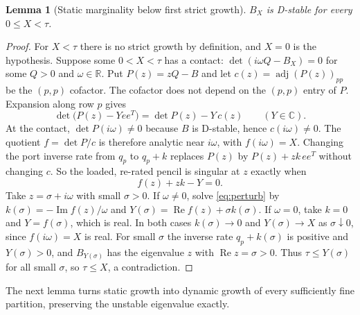 \documentclass[11pt,a4paper]{article}
\theoremstyle{plain}
\newtheorem{lemma}[theorem]{Lemma}
\theoremstyle{definition}
\theoremstyle{remark}
\newcommand{\R}{\mathbb{R}}
\newcommand{\C}{\mathbb{C}}
\newcommand{\Real}{\operatorname{Re}}
\newcommand{\Imag}{\operatorname{Im}}
\newcommand{\adj}{\operatorname{adj}}
\begin{document}
\begin{lemma}[Static marginality below first strict growth]\label{lem:marginal}
$B_X$ is D-stable for every $0\le X<\tau$.
\end{lemma}
\begin{proof}
For $X<\tau$ there is no strict growth by definition, and $X=0$ is the
hypothesis. Suppose some $0<X<\tau$ has a contact: $\det(i\omega Q-B_X)=0$ for
some $Q>0$ and $\omega\in\R$. Put $P(z)=zQ-B$ and let
$c(z)=\adj(P(z))_{pp}$ be the $(p,p)$ cofactor. The cofactor does not depend on
the $(p,p)$ entry of $P$. Expansion along row $p$ gives
\[
 \det\bigl(P(z)-Yee^{T}\bigr)=\det P(z)-Y\,c(z)\qquad(Y\in\C).
\]
At the contact, $\det P(i\omega)\ne0$ because $B$ is D-stable, hence
$c(i\omega)\ne0$. The quotient $f=\det P/c$ is therefore analytic near
$i\omega$, with $f(i\omega)=X$. Changing the port inverse rate from $q_p$ to
$q_p+k$ replaces $P(z)$ by $P(z)+zk\,ee^{T}$ without changing $c$. So the
loaded, re-rated pencil is singular at $z$ exactly when
\begin{equation}\label{eq:perturb}
 f(z)+zk-Y=0 .
\end{equation}
Take $z=\sigma+i\omega$ with small $\sigma>0$. If $\omega\ne0$, solve
\eqref{eq:perturb} by $k(\sigma)=-\Imag f(z)/\omega$ and
$Y(\sigma)=\Real f(z)+\sigma k(\sigma)$. If $\omega=0$, take $k=0$ and
$Y=f(\sigma)$, which is real. In both cases $k(\sigma)\to0$ and
$Y(\sigma)\to X$ as $\sigma\downarrow0$, since $f(i\omega)=X$ is real. For
small $\sigma$ the inverse rate $q_p+k(\sigma)$ is positive and $Y(\sigma)>0$,
and $B_{Y(\sigma)}$ has the eigenvalue $z$ with $\Real z=\sigma>0$. Thus
$\tau\le Y(\sigma)$ for all small $\sigma$, so $\tau\le X$, a contradiction.
\end{proof}

The next lemma turns static growth into dynamic growth of every sufficiently
fine partition, preserving the unstable eigenvalue exactly.
\end{document}

